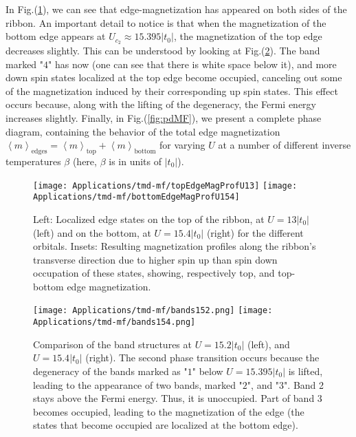 In Fig.(\ref{fig:wfs1}), we can see that edge-magnetization has appeared on both sides of the ribbon.
An important detail to notice is that when the magnetization of the bottom edge appears at $U_{c_2} \approx 15.395 |t_0|$, the magnetization of the top edge decreases slightly.
This can be understood by looking at Fig.(\ref{fig:bandDegen}).
The band marked "$4$" has now  (one can see that there is white space below it), and more down spin states localized at the top edge become occupied, canceling out some of the magnetization induced by their corresponding up spin states.
This effect occurs because, along with the lifting of the degeneracy, the Fermi energy increases slightly.
Finally, in Fig.(\ref{fig:pdMF}), we present a complete phase diagram, containing the behavior of the total edge magnetization $\left\langle m \right\rangle_{\text{edges}} = \left\langle m \right\rangle_{\text{top}} + \left\langle m \right\rangle_{\text{bottom}}$ for varying $U$ at a number of different inverse temperatures $\beta$ (here, $\beta$ is in units of $| t_0 |$).
\begin{figure}[H]
\hspace{0.8cm}
\texttt{[image: Applications/tmd-mf/topEdgeMagProfU13]}
\texttt{[image: Applications/tmd-mf/bottomEdgeMagProfU154]}
	\caption[Localized edge states on the top and on the bottom of the ribbon for the different orbitals. Resulting magnetization profile along the ribbon's transverse direction due to higher spin up than spin down occupation.]{Left: Localized edge states on the top of the ribbon, at $U = 13 |t_0|$ (left) and on the bottom, at $U = 15.4 |t_0|$ (right) for the different orbitals. Insets: Resulting magnetization profiles along the ribbon's transverse direction due to higher spin up than spin down occupation of these states, showing, respectively top, and top-bottom edge magnetization.}
	\label{fig:wfs1}
\end{figure}
\vspace{-0.5cm}
\begin{figure}[H]
\hspace{0.3cm}
\texttt{[image: Applications/tmd-mf/bands152.png]}
\hspace{8mm}
\texttt{[image: Applications/tmd-mf/bands154.png]}
	\caption[Comparison of the band structures at $U = 15.2| t_0 |$, and $U=15.4| t_0 |$.]{Comparison of the band structures at $U = 15.2| t_0 |$ (left), and $U=15.4| t_0 |$ (right). The second phase transition occurs because the degeneracy of the bands marked as "$1$" below $U = 15.395 | t_0 |$ is lifted, leading to the appearance of two bands, marked "$2$", and "$3$". Band 2 stays above the Fermi energy. Thus, it is unoccupied. Part of band 3 becomes occupied, leading to the magnetization of the edge (the states that become occupied are localized at the bottom edge).}
	\label{fig:bandDegen}
\end{figure}
